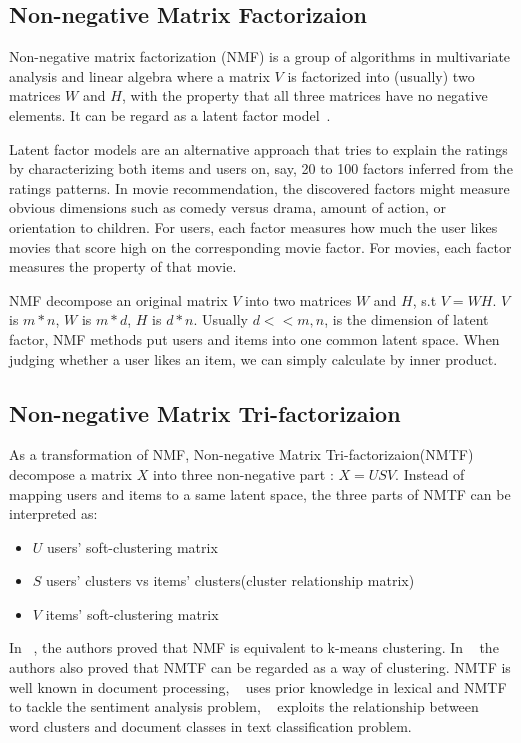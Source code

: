 \hspace{0.05in}
\subsection{Non-negative Matrix Factorizaion}
Non-negative matrix factorization (NMF) is a group of algorithms in multivariate analysis and linear algebra where a matrix $V$ is factorized into (usually) two matrices $W$ and $H$, with the property that all three matrices have no negative elements. It can be regard as a latent factor model~\cite{/computer/yehuda09matrix}.

Latent factor models are an alternative approach that tries to explain the ratings by characterizing both items and users on, say, 20 to 100 factors inferred from the ratings patterns. In movie recommendation, the discovered factors might measure obvious dimensions such as comedy versus
drama, amount of action, or orientation to children. For users, each factor measures how much the user likes movies that score high on the corresponding movie factor. For movies, each factor measures the property of that movie.

NMF decompose an original matrix $V$ into two matrices $W$ and $H$, s.t $V = WH$. $V$ is $m*n$, $W$ is $m*d$, $H$ is $d*n$. Usually $d << m,n$, is the dimension of latent factor, NMF methods put users and items into one common latent space. When judging whether a user likes an item, we can simply calculate by inner product.

\hspace{0.05in}
\subsection{Non-negative Matrix Tri-factorizaion}
As a transformation of NMF, Non-negative Matrix Tri-factorizaion(NMTF) decompose a matrix $X$ into three non-negative part : $X = USV$. Instead of mapping users and items to a same latent space, the three parts of NMTF can be interpreted as:
\begin{itemize}
\item $U$ users' soft-clustering matrix
\item $S$ users' clusters vs items' clusters(cluster relationship matrix)
\item $V$ items' soft-clustering matrix
\end{itemize}

In ~\cite{Ding05onthe}, the authors proved that NMF is equivalent to k-means clustering. In ~\cite{Ding06orthogonalnonnegative} the authors also proved that NMTF can be regarded as a way of clustering. NMTF is well known in document processing, ~\cite{Li:2009:NMT:1687878.1687914} uses prior knowledge in lexical and NMTF to tackle the sentiment analysis problem, ~\cite{Zhuang:2011:EAW:1952191.1952195} exploits the relationship between word clusters and document classes in text classification problem.

